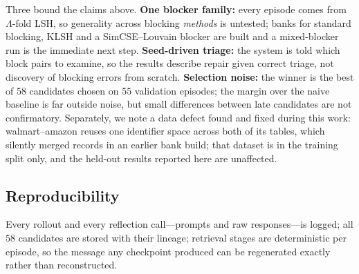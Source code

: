 \documentclass[11pt]{article}
\begin{document}
Three bound the claims above. \textbf{One blocker family:} every episode comes
from $\Lambda$-fold LSH, so generality across blocking \emph{methods} is
untested; banks for standard blocking, KLSH and a SimCSE--Louvain blocker are
built and a mixed-blocker run is the immediate next step. \textbf{Seed-driven
triage:} the system is told which block pairs to examine, so the results
describe repair given correct triage, not discovery of blocking errors from
scratch. \textbf{Selection noise:} the winner is the best of $58$ candidates
chosen on $55$ validation episodes; the margin over the naive baseline is far
outside noise, but small differences between late candidates are not
confirmatory. Separately, we note a data defect found and fixed during this
work: walmart--amazon reuses one identifier space across both of its tables,
which silently merged records in an earlier bank build; that dataset is in the
training split only, and the held-out results reported here are unaffected.

\subsection{Reproducibility}

Every rollout and every reflection call---prompts and raw responses---is logged;
all $58$ candidates are stored with their lineage; retrieval stages are
deterministic per episode, so the message any checkpoint produced can be
regenerated exactly rather than reconstructed.
\end{document}
